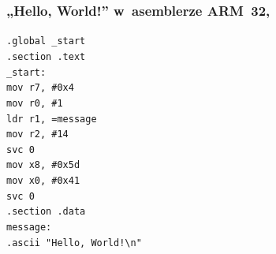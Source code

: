\documentclass[10pt,t]{beamer}
\begin{document}
\begin{frame}
  \frametitle{„Hello, World!” w~asemblerze ARM~32,
    \parencite{Low-Level-Learning-You-Can-Learn-ARM-ETC-Ver-2020}}


  \texttt{.global \_start} \\
  \texttt{.section .text} \\



  \texttt{\_start:} \\[-0.2em]
  \hphantom{aaaaaaaa} \texttt{mov r7, \#0x4} \\
  \hphantom{aaaaaaaa} \texttt{mov r0, \#1} \\
  \hphantom{aaaaaaaa} \texttt{ldr r1, =message} \\
  \hphantom{aaaaaaaa} \texttt{mov r2, \#14} \\

  \hphantom{aaaaaaaa} \texttt{svc 0} \\

  \hphantom{aaaaaaaa} \texttt{mov x8, \#0x5d} \\
  \hphantom{aaaaaaaa} \texttt{mov x0, \#0x41} \\

  \hphantom{aaaaaaaa} \texttt{svc 0} \\



  \texttt{.section .data} \\
  \texttt{message:} \\
  \hphantom{aaaaaaaa} \texttt{.ascii "Hello, World!\textbackslash n"}

\end{frame}
\end{document}
